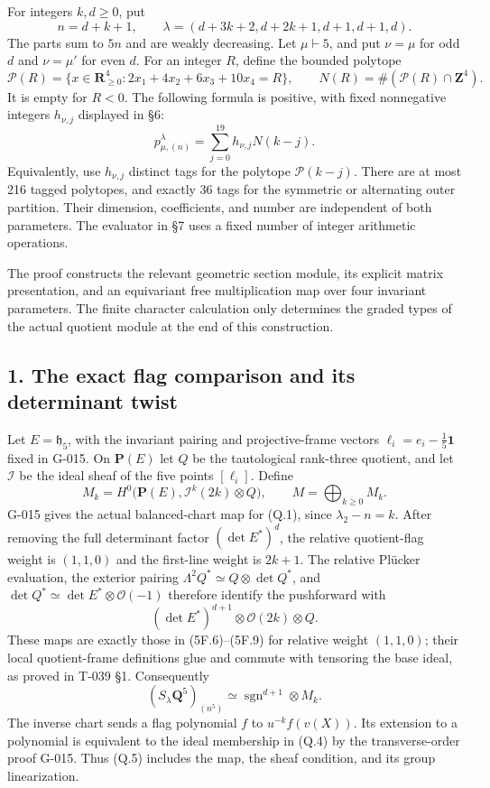 \documentclass[
  10pt,
]{article}
\begin{document}
For integers \(k,d\ge0\), put \[
n=d+k+1,\qquad
\lambda=(d+3k+2,d+2k+1,d+1,d+1,d).
\tag{Q.1}
\] The parts sum to \(5n\) and are weakly decreasing. Let
\(\mu\vdash5\), and put \(\nu=\mu\) for odd \(d\) and \(\nu=\mu'\) for
even \(d\). For an integer \(R\), define the bounded polytope \[
\mathscr P(R)=\{x\in\mathbf R_{\ge0}^4:
2x_1+4x_2+6x_3+10x_4=R\},\qquad
N(R)=\#(\mathscr P(R)\cap\mathbf Z^4).
\tag{Q.2}
\] It is empty for \(R<0\). The following formula is positive, with
fixed nonnegative integers \(h_{\nu,j}\) displayed in §6: \[
\boxed{p_{\mu,(n)}^\lambda
=\sum_{j=0}^{19}h_{\nu,j}N(k-j).}
\tag{Q.3}
\] Equivalently, use \(h_{\nu,j}\) distinct tags for the polytope
\(\mathscr P(k-j)\). There are at most 216 tagged polytopes, and exactly
36 tags for the symmetric or alternating outer partition. Their
dimension, coefficients, and number are independent of both parameters.
The evaluator in §7 uses a fixed number of integer arithmetic
operations.

The proof constructs the relevant geometric section module, its explicit
matrix presentation, and an equivariant free multiplication map over
four invariant parameters. The finite character calculation only
determines the graded types of the actual quotient module at the end of
this construction.

\subsection{1. The exact flag comparison and its determinant
twist}\label{the-exact-flag-comparison-and-its-determinant-twist}

Let \(E=\mathfrak h_5\), with the invariant pairing and projective-frame
vectors \(\ell_i=e_i-\frac15\mathbf1\) fixed in G-015. On
\(\mathbf P(E)\) let \(Q\) be the tautological rank-three quotient, and
let \(\mathcal I\) be the ideal sheaf of the five points \([\ell_i]\).
Define \[
M_k=H^0\bigl(\mathbf P(E),\mathcal I^k(2k)\otimes Q\bigr),
\qquad M=\bigoplus_{k\ge0}M_k.
\tag{Q.4}
\] G-015 gives the actual balanced-chart map for (Q.1), since
\(\lambda_2-n=k\). After removing the full determinant factor
\((\det E^*)^d\), the relative quotient-flag weight is \((1,1,0)\) and
the first-line weight is \(2k+1\). The relative Plücker evaluation, the
exterior pairing \(\Lambda^2 Q^*\simeq Q\otimes\det Q^*\), and
\(\det Q^*\simeq\det E^*\otimes\mathcal O(-1)\) therefore identify the
pushforward with \[
(\det E^*)^{d+1}\otimes\mathcal O(2k)\otimes Q.
\] These maps are exactly those in (5F.6)--(5F.9) for relative weight
\((1,1,0)\); their local quotient-frame definitions glue and commute
with tensoring the base ideal, as proved in T-039 §1. Consequently \[
\boxed{(S_\lambda\mathbf Q^5)_{(n^5)}
\simeq\operatorname{sgn}^{d+1}\otimes M_k.}
\tag{Q.5}
\] The inverse chart sends a flag polynomial \(f\) to \(u^{-k}f(v(X))\).
Its extension to a polynomial is equivalent to the ideal membership in
(Q.4) by the transverse-order proof G-015. Thus (Q.5) includes the map,
the sheaf condition, and its group linearization.
\end{document}
